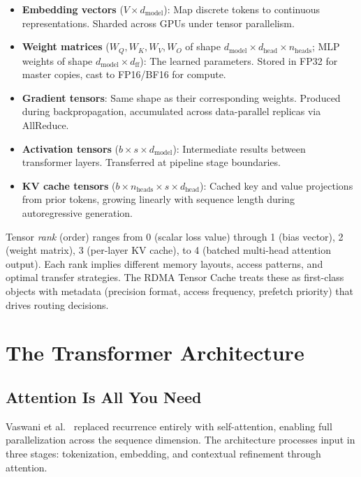 \documentclass[11pt,letterpaper]{article}
\theoremstyle{definition}
\begin{document}
\begin{itemize}
    \item \textbf{Embedding vectors} ($V \times d_{\text{model}}$): Map discrete tokens to continuous representations. Sharded across GPUs under tensor parallelism.
    \item \textbf{Weight matrices} ($W_Q, W_K, W_V, W_O$ of shape $d_{\text{model}} \times d_{\text{head}} \times n_{\text{heads}}$; MLP weights of shape $d_{\text{model}} \times d_{\text{ff}}$): The learned parameters. Stored in FP32 for master copies, cast to FP16/BF16 for compute.
    \item \textbf{Gradient tensors}: Same shape as their corresponding weights. Produced during backpropagation, accumulated across data-parallel replicas via AllReduce.
    \item \textbf{Activation tensors} ($b \times s \times d_{\text{model}}$): Intermediate results between transformer layers. Transferred at pipeline stage boundaries.
    \item \textbf{KV cache tensors} ($b \times n_{\text{heads}} \times s \times d_{\text{head}}$): Cached key and value projections from prior tokens, growing linearly with sequence length during autoregressive generation.
\end{itemize}

Tensor \emph{rank} (order) ranges from 0 (scalar loss value) through 1 (bias vector), 2 (weight matrix), 3 (per-layer KV cache), to 4 (batched multi-head attention output). Each rank implies different memory layouts, access patterns, and optimal transfer strategies. The RDMA Tensor Cache treats these as first-class objects with metadata (precision format, access frequency, prefetch priority) that drives routing decisions.

\section{The Transformer Architecture}
\label{sec:transformers}

\subsection{Attention Is All You Need}

Vaswani et al.~\cite{vaswani2017attention} replaced recurrence entirely with self-attention, enabling full parallelization across the sequence dimension. The architecture processes input in three stages: tokenization, embedding, and contextual refinement through attention.
\end{document}
